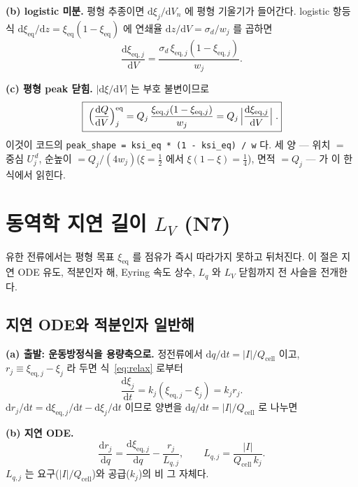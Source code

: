 \documentclass[11pt,a4paper]{article}
\newcommand{\dd}{\mathrm{d}}
\newcommand{\eq}{\mathrm{eq}}
\newcommand{\cell}{\mathrm{cell}}
\newcommand{\code}[1]{\texttt{#1}}
\begin{document}
\textbf{(b) logistic 미분.} 평형 추종이면 $\dd\xi_j/\dd V_n$ 에 평형 기울기가 들어간다.
logistic 항등식 $\dd\xi_\eq/\dd z = \xi_\eq(1-\xi_\eq)$ 에 연쇄율 $\dd z/\dd V = \sigma_d/w_j$ 를 곱하면
\begin{equation}
\frac{\dd\xi_{\eq,j}}{\dd V} = \frac{\sigma_d\,\xi_{\eq,j}(1-\xi_{\eq,j})}{w_j}.
\label{eq:dxidV}
\end{equation}

\textbf{(c) 평형 peak 닫힘.} $|\dd\xi/\dd V|$ 는 부호 불변이므로
\begin{equation}
\boxed{\;\Bigl(\frac{\dd Q}{\dd V}\Bigr)^\eq_j
=Q_j\,\frac{\xi_{\eq,j}(1-\xi_{\eq,j})}{w_j}
=Q_j\,\Bigl|\frac{\dd\xi_{\eq,j}}{\dd V}\Bigr|\;.}
\label{eq:eqpeak}
\end{equation}
이것이 코드의 \code{peak\_shape = ksi\_eq * (1 - ksi\_eq) / w} 다.
세 양 — 위치 $=$ 중심 $U_j^{\,d}$, 순높이 $=Q_j/(4w_j)$($\xi=\tfrac12$ 에서 $\xi(1-\xi)=\tfrac14$),
면적 $=Q_j$ — 가 이 한 식에서 읽힌다.

\section{동역학 지연 길이 $L_V$ (N7)}\label{sec:lag}
유한 전류에서는 평형 목표 $\xi_\eq$ 를 점유가 즉시 따라가지 못하고 뒤처진다. 이 절은 지연 ODE 유도,
적분인자 해, Eyring 속도 상수, $L_q$ 와 $L_V$ 닫힘까지 전 사슬을 전개한다.

\subsection{지연 ODE와 적분인자 일반해}

\textbf{(a) 출발: 운동방정식을 용량축으로.} 정전류에서 $\dd q/\dd t = |I|/Q_\cell$ 이고,
$r_j \equiv \xi_{\eq,j}-\xi_j$ 라 두면 식~\eqref{eq:relax} 로부터
\begin{equation}
\frac{\dd\xi_j}{\dd t} = k_j(\xi_{\eq,j}-\xi_j) = k_j r_j.
\label{eq:dxidt}
\end{equation}
$\dd r_j/\dd t = \dd\xi_{\eq,j}/\dd t - \dd\xi_j/\dd t$ 이므로 양변을 $\dd q/\dd t = |I|/Q_\cell$ 로 나누면

\textbf{(b) 지연 ODE.}
\begin{equation}
\frac{\dd r_j}{\dd q} = \frac{\dd\xi_{\eq,j}}{\dd q} - \frac{r_j}{L_{q,j}},
\qquad L_{q,j} = \frac{|I|}{Q_\cell\,k_j}.
\label{eq:Lq}
\end{equation}
$L_{q,j}$ 는 요구($|I|/Q_\cell$)와 공급($k_j$)의 비 그 자체다.
\end{document}
